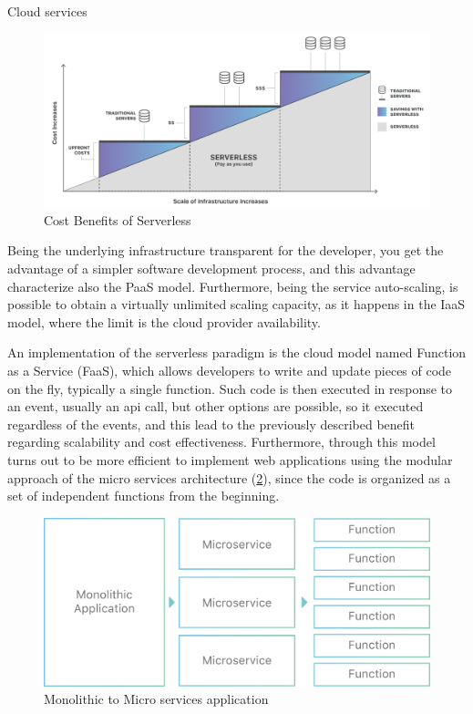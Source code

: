 \begin{chapter}{Cloud services}
    \begin{figure}
        \centering
        \includegraphics[width=\linewidth]{source/images/benefits-of-serverless.png}
        \caption{Cost Benefits of Serverless}
        \label{fig:serverless_benefits}
    \end{figure}

    Being the underlying infrastructure transparent for the developer, you get the advantage
    of a simpler software development process, and this advantage characterize also
    the PaaS model. Furthermore, being the service auto-scaling, is possible to obtain
    a virtually unlimited scaling capacity, as it happens in the IaaS model, where the
    limit is the cloud provider availability.

    An implementation of the serverless paradigm is the cloud model named Function
    as a Service (FaaS), which allows developers to write and update pieces of code
    on the fly, typically a single function.
    Such code is then executed in response to an event, usually an api call, but other
    options are possible, so it executed regardless of the events, and this lead to
    the previously described benefit regarding scalability and cost effectiveness.
    Furthermore, through this model turns out to be more efficient to implement web
    applications using the modular approach of the micro services architecture
    (\ref{fig:monolithic_to_microservices}), since the code is organized as a set of
    independent functions from the beginning.

    \begin{figure}
        \centering
        \includegraphics[width=\linewidth]{source/images/monolithic-application-microservice-faas.png}
        \caption{Monolithic to Micro services application}
        \label{fig:monolithic_to_microservices}
    \end{figure}


\end{chapter}
